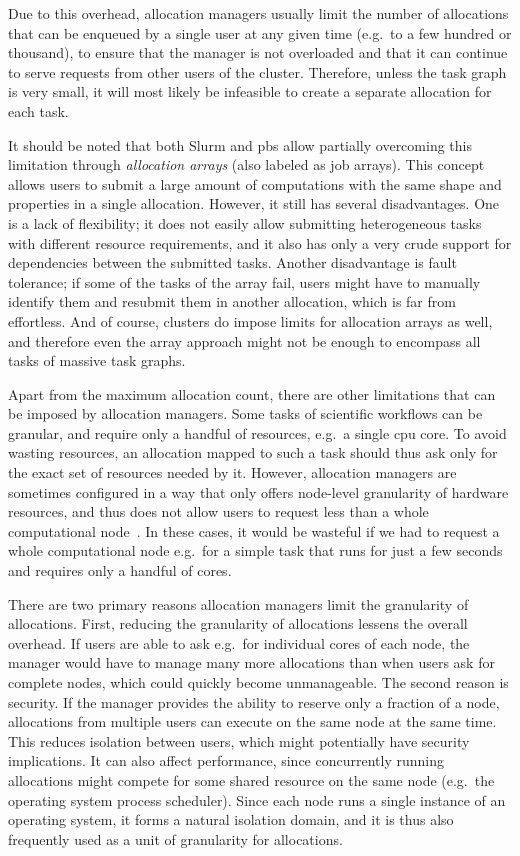 Due to this overhead, allocation managers usually limit the number of allocations that can be
enqueued by a single user at any given time (e.g.\ to a few hundred or thousand), to ensure that
the manager is not overloaded and that it can continue to serve requests from other users of the
cluster. Therefore, unless the task graph is very small, it will most likely be infeasible to
create a separate allocation for each task.

It should be noted that both Slurm and \gls{pbs} allow partially overcoming this
limitation through \emph{allocation arrays} (also labeled as job arrays). This concept allows users to submit a large amount
of computations with the same shape and properties in a single allocation. However, it still has
several disadvantages. One is a lack of flexibility; it does not easily allow submitting
heterogeneous tasks with different resource requirements, and it also has only a very crude support
for dependencies between the submitted tasks. Another disadvantage is fault tolerance; if some of
the tasks of the array fail, users might have to manually identify them and resubmit them in
another allocation, which is far from effortless. And of course, clusters do impose limits for
allocation arrays as well, and therefore even the array approach might not be enough to encompass
all tasks of massive task graphs.

Apart from the maximum allocation count, there are other limitations that can be imposed by
allocation managers. Some tasks of scientific workflows can be granular, and require only a handful
of resources, e.g.\ a single \gls{cpu} core. To avoid wasting resources, an
allocation mapped to such a task should thus ask only for the exact set of resources needed by it.
However, allocation managers are sometimes configured in a way that only offers node-level
granularity of hardware resources, and thus does not allow users to request less than a whole
computational node~\cite{it4i_node_scheduling_policy}. In these cases, it would be wasteful if we had to
request a whole computational node e.g.\ for a simple task that runs for just a few seconds and
requires only a handful of cores.

There are two primary reasons allocation managers limit the granularity of allocations. First,
reducing the granularity of allocations lessens the overall overhead. If users are able to ask
e.g.\ for individual cores of each node, the manager would have to manage many more allocations
than when users ask for complete nodes, which could quickly become unmanageable. The second reason
is security. If the manager provides the ability to reserve only a fraction of a node, allocations
from multiple users can execute on the same node at the same time. This reduces isolation between
users, which might potentially have security implications. It can also affect performance, since
concurrently running allocations might compete for some shared resource on the same node (e.g.\ the
operating system process scheduler). Since each node runs a single instance of an operating system,
it forms a natural isolation domain, and it is thus also frequently used as a unit of granularity
for allocations.

